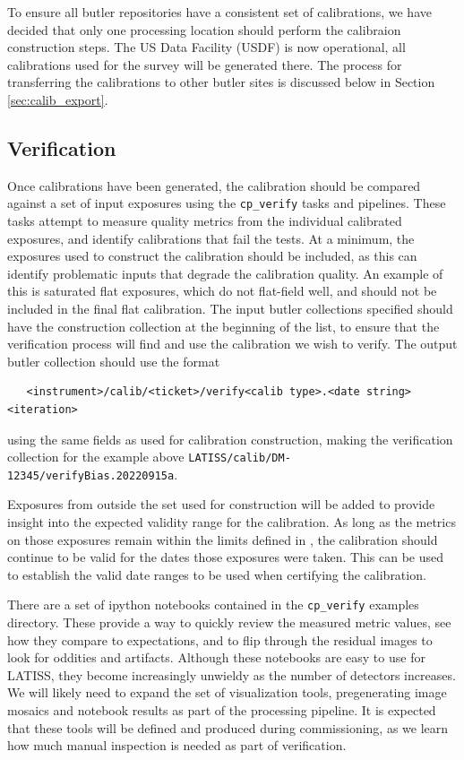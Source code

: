 \documentclass[DM,authoryear,toc]{lsstdoc}
\begin{document}
To ensure all butler repositories have a consistent set of calibrations, we have decided that only one processing location should perform the calibraion construction steps.  The US Data Facility (USDF) is now operational, all calibrations used for the survey will be generated there.  The process for transferring the calibrations to other butler sites is discussed below in Section \ref{sec:calib_export}.

\subsection{Verification}

Once calibrations have been generated, the calibration should be compared against a set of input exposures using the \verb|cp_verify| tasks and pipelines.  These tasks attempt to measure quality metrics from the individual calibrated exposures, and identify calibrations that fail the tests.  At a minimum, the exposures used to construct the calibration should be included, as this can identify problematic inputs that degrade the calibration quality.  An example of this is saturated flat exposures, which do not flat-field well, and should not be included in the final flat calibration.  The input butler collections specified should have the construction collection at the beginning of the list, to ensure that the verification process will find and use the calibration we wish to verify.  The output butler collection should use the format
\begin{verbatim}
   <instrument>/calib/<ticket>/verify<calib type>.<date string><iteration>
\end{verbatim}
\noindent using the same fields as used for calibration construction, making the verification collection for the example above \verb|LATISS/calib/DM-12345/verifyBias.20220915a|.

Exposures from outside the set used for construction will be added to provide insight into the expected validity range for the calibration.  As long as the metrics on those exposures remain within the limits defined in , the calibration should continue to be valid for the dates those exposures were taken.  This can be used to establish the valid date ranges to be used when certifying the calibration.

There are a set of ipython notebooks contained in the \verb|cp_verify| examples directory.  These provide a way to quickly review the measured metric values, see how they compare to expectations, and to flip through the residual images to look for oddities and artifacts.  Although these notebooks are easy to use for LATISS, they become increasingly unwieldy as the number of detectors increases.  We will likely need to expand the set of visualization tools, pregenerating image mosaics and notebook results as part of the processing pipeline.  It is expected that these tools will be defined and produced during commissioning, as we learn how much manual inspection is needed as part of verification.
\end{document}
